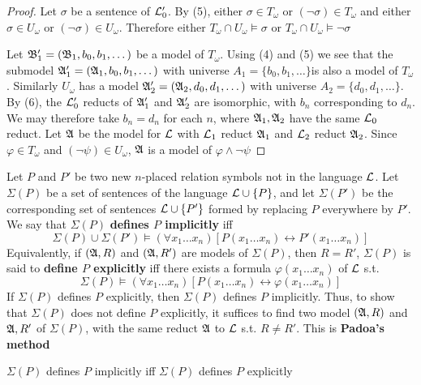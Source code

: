 \documentclass[11pt]{article}
\begin{document}
\begin{proof}
Let \(\sigma\) be a sentence of \(\mathcal{L}_0'\). By (5), either \(\sigma\in T_\omega\) or
\((\neg\sigma)\in T_\omega\) and either \(\sigma\in U_\omega\) or
\((\neg\sigma)\in U_\omega\). Therefore either \(T_\omega\cap
   U_\omega\models\sigma\)
or \(T_\omega\cap U_\omega\models\neg\sigma\)

Let \(\mathfrak{B}_1'=(\mathfrak{B}_1,b_0,b_1,\dots)\) be a model of \(T_\omega\). Using (4)
and (5) we  see that the submodel \(\mathfrak{A}_1' = (\mathfrak{A}_1,b_0,b_1,\dots)\) with
universe \(A_1=\{b_0,b_1,\dots\}\)is also a model of \(T_\omega\). Similarly
\(U_\omega\) has a model \(\mathfrak{A}_2'=(\mathfrak{A}_2,d_0,d_1,\dots)\) with universe \(A_2
   =\{d_0,d_1,\dots\}\).
By (6), the \(\mathcal{L}_0'\) reducts of \(\mathfrak{A}_1'\) and \(\mathfrak{A}_2'\) are isomorphic,
with \(b_n\) corresponding to \(d_n\). We may therefore take \(b_n=d_n\) for
each \(n\), where \(\mathfrak{A}_1,\mathfrak{A}_2\) have the same \(\mathcal{L}_0\) reduct. Let
\(\mathfrak{A}\) be the model for \(\mathcal{L}\) with \(\mathcal{L}_1\) reduct \(\mathfrak{A}_1\) and
\(\mathcal{L}_2\) reduct \(\mathfrak{A}_2\). Since \(\varphi\in T_\omega\) and
\((\neg\psi)\in U_\omega\), \(\mathfrak{A}\) is a model of \(\varphi\wedge\neg\psi\)
\end{proof}

Let \(P\) and \(P'\) be two new \(n\)-placed relation symbols not in the
language \(\mathcal{L}\). Let \(\Sigma(P)\) be a set of sentences of the language
\(\mathcal{L}\cup\{P\}\), and let \(\Sigma(P')\) be the corresponding set of sentences
\(\mathcal{L}\cup\{P'\}\) formed by replacing \(P\) everywhere by \(P'\). We say
that \(\Sigma(P)\) \textbf{defines \(P\) implicitly} iff
\begin{equation*}
\Sigma(P)\cup\Sigma(P')\models(\forall x_1\dots x_n)[P(x_1\dots x_n)\leftrightarrow P'(x_1\dots x_n)]
\end{equation*}
Equivalently, if \((\mathfrak{A},R)\) and \((\mathfrak{A},R')\) are models of \(\Sigma(P)\), then
\(R=R'\), \(\Sigma(P)\) is said to \textbf{define \(P\) explicitly} iff there exists a
formula \(\varphi(x_1\dots x_n)\) of \(\mathcal{L}\) s.t.
\begin{equation*}
\Sigma(P)\models(\forall x_1\dots x_n)[P(x_1\dots x_n)\leftrightarrow \varphi(x_1\dots x_n)]
\end{equation*}
If \(\Sigma(P)\) defines \(P\) explicitly, then \(\Sigma(P)\) defines \(P\) implicitly.
Thus, to show that \(\Sigma(P)\) does not define \(P\) explicitly, it suffices to
find two model \((\mathfrak{A},R)\) and \(\mathfrak{A},R'\) of \(\Sigma(P)\), with the same reduct
\(\mathfrak{A}\) to \(\mathcal{L}\) s.t. \(R\neq R'\). This is \textbf{Padoa's method}

\begin{theorem}
\(\Sigma(P)\) defines \(P\) implicitly iff \(\Sigma(P)\) defines \(P\) explicitly
\end{theorem}
\end{document}
